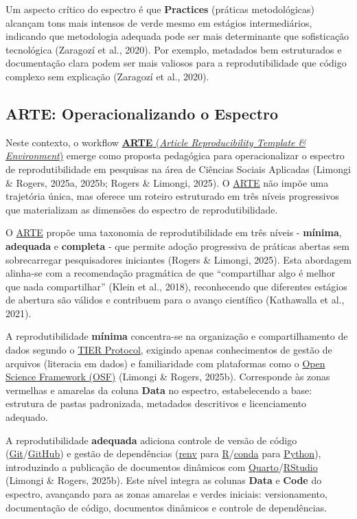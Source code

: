 \documentclass[
  a4paper,
]{book}
\begin{document}
Um aspecto crítico do espectro é que \textbf{Practices} (práticas
metodológicas) alcançam tons mais intensos de verde mesmo em estágios
intermediários, indicando que metodologia adequada pode ser mais
determinante que sofisticação tecnológica (Zaragozí et al., 2020). Por
exemplo, metadados bem estruturados e documentação clara podem ser mais
valiosos para a reprodutibilidade que código complexo sem explicação
(Zaragozí et al., 2020).

\subsection{ARTE: Operacionalizando o
Espectro}\label{arte-operacionalizando-o-espectro}

Neste contexto, o workflow
\href{https://phdpablo.github.io/article-template/}{\textbf{ARTE}
(\emph{Article Reproducibility Template \& Environment})} emerge como
proposta pedagógica para operacionalizar o espectro de reprodutibilidade
em pesquisas na área de Ciências Sociais Aplicadas (Limongi \& Rogers,
2025a, 2025b; Rogers \& Limongi, 2025). O
\href{(https://phdpablo.github.io/article-template/)}{ARTE} não impõe
uma trajetória única, mas oferece um roteiro estruturado em três níveis
progressivos que materializam as dimensões do espectro de
reprodutibilidade.

O \href{https://phdpablo.github.io/article-template/}{ARTE} propõe uma
taxonomia de reprodutibilidade em três níveis - \textbf{mínima},
\textbf{adequada} e \textbf{completa} - que permite adoção progressiva
de práticas abertas sem sobrecarregar pesquisadores iniciantes (Rogers
\& Limongi, 2025). Esta abordagem alinha-se com a recomendação
pragmática de que ``compartilhar algo é melhor que nada compartilhar''
(Klein et al., 2018), reconhecendo que diferentes estágios de abertura
são válidos e contribuem para o avanço científico (Kathawalla et al.,
2021).

A reprodutibilidade \textbf{mínima} concentra-se na organização e
compartilhamento de dados segundo o
\href{https://www.projecttier.org/tier-protocol/protocol-4-0/}{TIER
Protocol}, exigindo apenas conhecimentos de gestão de arquivos
(literacia em dados) e familiaridade com plataformas como o
\href{https://osf.io/}{Open Science Framework (OSF)} (Limongi \& Rogers,
2025b). Corresponde às zonas vermelhas e amarelas da coluna
\textbf{Data} no espectro, estabelecendo a base: estrutura de pastas
padronizada, metadados descritivos e licenciamento adequado.

A reprodutibilidade \textbf{adequada} adiciona controle de versão de
código
(\href{https://git-scm.com/}{Git}/\href{https://github.com/}{GitHub}) e
gestão de dependências (\href{https://rstudio.github.io/renv/}{renv}
para
\href{https://www.r-project.org/}{R}/\href{https://docs.conda.io/}{conda}
para \href{https://www.python.org/}{Python}), introduzindo a publicação
de documentos dinâmicos com
\href{https://quarto.org/}{Quarto}/\href{https://posit.co/products/open-source/rstudio/}{RStudio}
(Limongi \& Rogers, 2025b). Este nível integra as colunas \textbf{Data}
e \textbf{Code} do espectro, avançando para as zonas amarelas e verdes
iniciais: versionamento, documentação de código, documentos dinâmicos e
controle de dependências.
\end{document}
